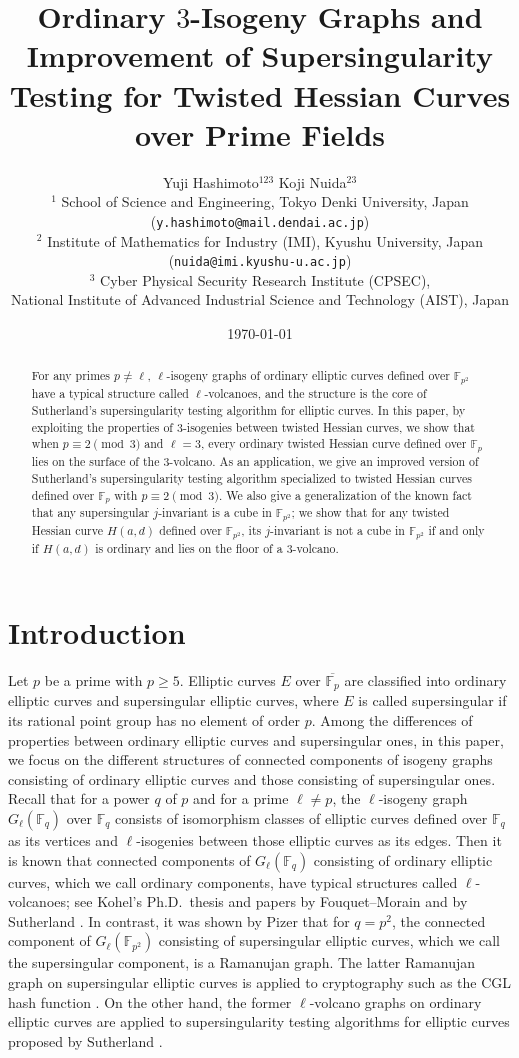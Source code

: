 \documentclass{article}
\title{Ordinary $3$-Isogeny Graphs and Improvement of Supersingularity Testing for Twisted Hessian Curves over Prime Fields}
\author{Yuji Hashimoto${}^{123}$ \qquad Koji Nuida${}^{23}$\medskip\\
${}^1$ School of Science and Engineering, Tokyo Denki University, Japan\\ (\texttt{y.hashimoto@mail.dendai.ac.jp})\\
${}^2$ Institute of Mathematics for Industry (IMI), Kyushu University, Japan\\ (\texttt{nuida@imi.kyushu-u.ac.jp})\\
${}^3$ Cyber Physical Security Research Institute (CPSEC),\\ National Institute of Advanced Industrial Science and Technology (AIST), Japan}
\date{\today}
\theoremstyle{definition}
\newcommand{\FF}{\mathbb{F}}
\begin{document}
\maketitle

\begin{abstract}
For any primes $p \neq \ell$, $\ell$-isogeny graphs of ordinary elliptic curves defined over $\FF_{p^2}$ have a typical structure called $\ell$-volcanoes, and the structure is the core of Sutherland's supersingularity testing algorithm for elliptic curves.
In this paper, by exploiting the properties of $3$-isogenies between twisted Hessian curves, we show that when $p \equiv 2 \pmod{3}$ and $\ell = 3$, every ordinary twisted Hessian curve defined over $\FF_p$ lies on the surface of the $3$-volcano.
As an application, we give an improved version of Sutherland's supersingularity testing algorithm specialized to twisted Hessian curves defined over $\FF_p$ with $p \equiv 2 \pmod{3}$.
We also give a generalization of the known fact that any supersingular $j$-invariant is a cube in $\FF_{p^2}$; we show that for any twisted Hessian curve $H(a,d)$ defined over $\FF_{p^2}$, its $j$-invariant is not a cube in $\FF_{p^2}$ if and only if $H(a,d)$ is ordinary and lies on the floor of a $3$-volcano.
\end{abstract}


\section{Introduction}
\label{sec:introduction}

Let $p$ be a prime with $p \geq 5$.
Elliptic curves $E$ over $\overline{\FF_p}$ are classified into ordinary elliptic curves and supersingular elliptic curves, where $E$ is called supersingular if its rational point group has no element of order $p$.
Among the differences of properties between ordinary elliptic curves and supersingular ones, in this paper, we focus on the different structures of connected components of isogeny graphs consisting of ordinary elliptic curves and those consisting of supersingular ones.
Recall that for a power $q$ of $p$ and for a prime $\ell \neq p$, the $\ell$-isogeny graph $G_{\ell}(\FF_q)$ over $\FF_q$ consists of isomorphism classes of elliptic curves defined over $\FF_q$ as its vertices and $\ell$-isogenies between those elliptic curves as its edges.
Then it is known that connected components of $G_{\ell}(\FF_q)$ consisting of ordinary elliptic curves, which we call ordinary components, have typical structures called $\ell$-volcanoes; see Kohel's Ph.D.\ thesis \cite{Kohel:thesis} and papers by Fouquet--Morain \cite{DBLP:conf/ants/FouquetM02} and by Sutherland \cite{Sutherland:ANTSX}.
In contrast, it was shown by Pizer \cite{pizer1990ramanujan} that for $q = p^2$, the connected component of $G_{\ell}(\FF_{p^2})$ consisting of supersingular elliptic curves, which we call the supersingular component, is a Ramanujan graph.
The latter Ramanujan graph on supersingular elliptic curves is applied to cryptography such as the CGL hash function \cite{JC:ChaLauGor09}.
On the other hand, the former $\ell$-volcano graphs on ordinary elliptic curves are applied to supersingularity testing algorithms for elliptic curves proposed by Sutherland \cite{DBLP:journals/lmsjcm/Sutherland12a}.
\end{document}
